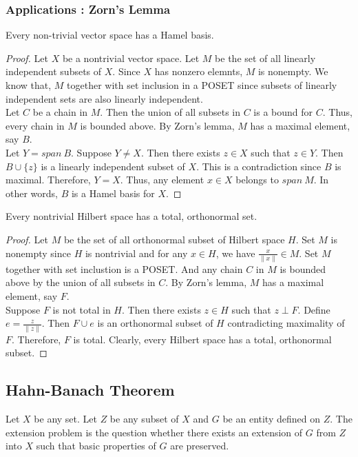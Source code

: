 \subsubsection{Applications : Zorn's Lemma}
\begin{remark}
	Every non-trivial vector space has a Hamel basis.
\end{remark}
\begin{proof}
	Let $X$ be a nontrivial vector space.
	Let $M$ be the set of all linearly independent subsets of $X$.
	Since $X$ has nonzero elemnts, $M$ is nonempty.
	We know that, $M$ together with set inclusion in a POSET since subsets of linearly independent sets are also linearly independent.\\

	Let $C$ be a chain in $M$.
	Then the union of all subsets in $C$ is a bound for $C$.
	Thus, every chain in $M$ is bounded above.
	By Zorn's lemma, $M$ has a maximal element, say $B$.\\

	Let $Y = span\ B$.
	Suppose $Y \ne X$.
	Then there exists $z \in X$ such that $z \in Y$.
	Then $B \cup \{ z \}$ is a linearly independent subset of $X$.
	This is a contradiction since $B$ is maximal.
	Therefore, $Y = X$.
	Thus, any element $x \in X$ belongs to $span\ M$.
	In other words, $B$ is a Hamel basis for $X$.
\end{proof}

\begin{remark}
	Every nontrivial Hilbert space has a total, orthonormal set.
\end{remark}
\begin{proof}
	Let $M$ be the set of all orthonormal subset of Hilbert space $H$.
	Set $M$ is nonempty since $H$ is nontrivial and for any $x \in H$, we have $\frac{x}{\|x\|} \in M$.
	Set $M$ together with set inclustion is a POSET.
	And any chain $C$ in $M$ is bounded above by the union of all subsets in $C$.
	By Zorn's lemma, $M$ has a maximal element, say $F$.\\

	Suppose $F$ is not total in $H$.
	Then there exists $z \in H$ such that $z \perp F$.
	Define $e = \frac{z}{\|z\|}$.
	Then $F \cup {e}$ is an orthonormal subset of $H$ contradicting maximality of $F$.
	Therefore, $F$ is total.
	Clearly, every Hilbert space has a total, orthonormal subset.
\end{proof}

\subsection{Hahn-Banach Theorem}
\begin{definition}
	Let $X$ be any set.
	Let $Z$ be any subset of $X$ and $G$ be an entity defined on $Z$.
	The extension problem is the question whether there exists an extension of $G$ from $Z$ into $X$ such that basic properties of $G$ are preserved.
\end{definition}

